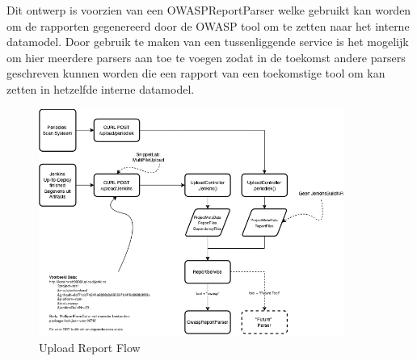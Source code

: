 Dit ontwerp is voorzien van een OWASPReportParser welke gebruikt kan worden om de rapporten gegenereerd door de OWASP tool om te zetten naar het interne datamodel. Door gebruik te maken van een tussenliggende service is het mogelijk om hier meerdere parsers aan toe te voegen zodat in de toekomst andere parsers geschreven kunnen worden die een rapport van een toekomstige tool om kan zetten in hetzelfde interne datamodel.


\begin{figure}[bth]
    \myfloatalign
    \includegraphics[width=10cm]{gfx/SOUPAPI-UploadAnalysis}
    \caption{Upload Report Flow}
    \label{fig:UploadReportFlow}
\end{figure}

